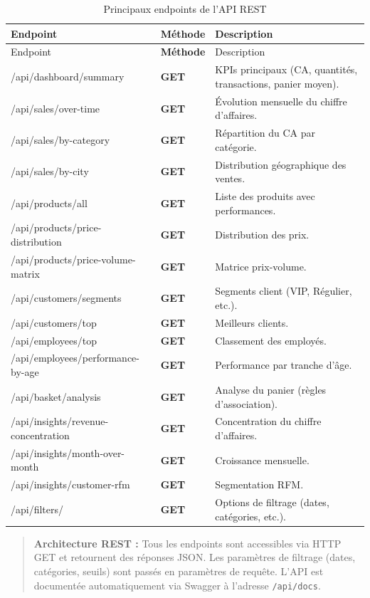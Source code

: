 \documentclass[12pt,a4paper,twoside]{report}
\begin{document}
\begin{longtable}{>{\ttfamily}p{4.5cm}>{\bfseries}p{1.5cm}p{6.5cm}}
\caption{Principaux endpoints de l'API REST}
\label{tab:api-endpoints}
\endfirsthead
\toprule
\rowcolor{TableHeader}
\color{white}Endpoint & \color{white}Méthode & \color{white}Description \\
\midrule
\endhead
\bottomrule
\endfoot
\toprule
\rowcolor{TableHeader}
\color{white}Endpoint & \color{white}Méthode & \color{white}Description \\
\midrule
/api/dashboard/summary & GET & KPIs principaux (CA, quantités, transactions, panier moyen). \\
/api/sales/over-time & GET & Évolution mensuelle du chiffre d'affaires. \\
/api/sales/by-category & GET & Répartition du CA par catégorie. \\
/api/sales/by-city & GET & Distribution géographique des ventes. \\
/api/products/all & GET & Liste des produits avec performances. \\
/api/products/price-distribution & GET & Distribution des prix. \\
/api/products/price-volume-matrix & GET & Matrice prix-volume. \\
/api/customers/segments & GET & Segments client (VIP, Régulier, etc.). \\
/api/customers/top & GET & Meilleurs clients. \\
/api/employees/top & GET & Classement des employés. \\
/api/employees/performance-by-age & GET & Performance par tranche d'âge. \\
/api/basket/analysis & GET & Analyse du panier (règles d'association). \\
/api/insights/revenue-concentration & GET & Concentration du chiffre d'affaires. \\
/api/insights/month-over-month & GET & Croissance mensuelle. \\
/api/insights/customer-rfm & GET & Segmentation RFM. \\
/api/filters/ & GET & Options de filtrage (dates, catégories, etc.). \\
\end{longtable}

\begin{quotation}
\noindent\textbf{Architecture REST :}\newline
Tous les endpoints sont accessibles via HTTP GET et retournent des réponses JSON. Les paramètres de filtrage (dates, catégories, seuils) sont passés en paramètres de requête. L'API est documentée automatiquement via Swagger à l'adresse \texttt{/api/docs}.
\end{quotation}
\end{document}
